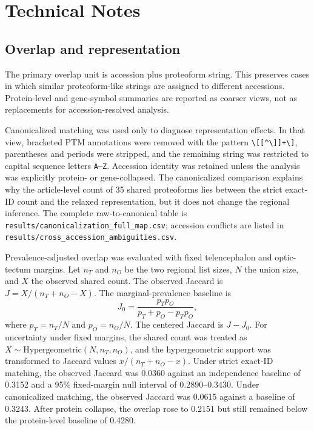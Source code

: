 \section{Technical Notes}

\subsection{Overlap and representation}

The primary overlap unit is accession plus proteoform string. This preserves cases in which similar proteoform-like strings are assigned to different accessions. Protein-level and gene-symbol summaries are reported as coarser views, not as replacements for accession-resolved analysis.

Canonicalized matching was used only to diagnose representation effects. In that view, bracketed PTM annotations were removed with the pattern \texttt{\textbackslash[[\^{}\textbackslash]]+\textbackslash]}, parentheses and periods were stripped, and the remaining string was restricted to capital sequence letters \texttt{A--Z}. Accession identity was retained unless the analysis was explicitly protein- or gene-collapsed. The canonicalized comparison explains why the article-level count of 35 shared proteoforms lies between the strict exact-ID count and the relaxed representation, but it does not change the regional inference. The complete raw-to-canonical table is \texttt{results/canonicalization\_full\_map.csv}; accession conflicts are listed in \texttt{results/cross\_accession\_ambiguities.csv}.

Prevalence-adjusted overlap was evaluated with fixed telencephalon and optic-tectum margins. Let $n_T$ and $n_O$ be the two regional list sizes, $N$ the union size, and $X$ the observed shared count. The observed Jaccard is $J=X/(n_T+n_O-X)$. The marginal-prevalence baseline is
\[
J_0 = \frac{p_Tp_O}{p_T+p_O-p_Tp_O},
\]
where $p_T=n_T/N$ and $p_O=n_O/N$. The centered Jaccard is $J-J_0$. For uncertainty under fixed margins, the shared count was treated as $X \sim \mathrm{Hypergeometric}(N,n_T,n_O)$, and the hypergeometric support was transformed to Jaccard values $x/(n_T+n_O-x)$. Under strict exact-ID matching, the observed Jaccard was 0.0360 against an independence baseline of 0.3152 and a 95\% fixed-margin null interval of 0.2890--0.3430. Under canonicalized matching, the observed Jaccard was 0.0615 against a baseline of 0.3243. After protein collapse, the overlap rose to 0.2151 but still remained below the protein-level baseline of 0.4280.

